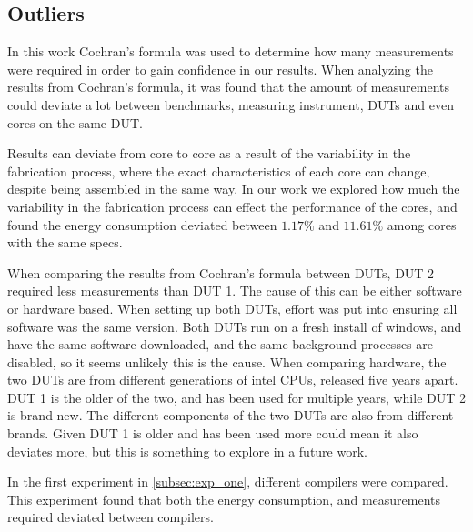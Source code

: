 \subsection{Outliers}

In this work Cochran's formula was used to determine how many measurements were required in order to gain confidence in our results. When analyzing the results from Cochran's formula, it was found that the amount of measurements could deviate a lot between benchmarks, measuring instrument, DUTs and even cores on the same DUT.

Results can deviate from core to core as a result of the variability in the fabrication process, where the exact characteristics of each core can change, despite being assembled in the same way.\cite{Mauzy2020} In our work we explored how much the variability in the fabrication process can effect the performance of the cores, and found the energy consumption deviated between $1.17\%$ and $11.61\%$ among cores with the same specs.

When comparing the results from Cochran's formula between DUTs, DUT 2 required less measurements than DUT 1. The cause of this can be either software or hardware based. When setting up both DUTs, effort was put into ensuring all software was the same version. Both DUTs run on a fresh install of windows, and have the same software downloaded, and the same background processes are disabled, so it seems unlikely this is the cause. When comparing hardware, the two DUTs are from different generations of intel CPUs, released five years apart. DUT 1 is the older of the two, and has been used for multiple years, while DUT 2 is brand new. The different components of the two DUTs are also from different brands. Given DUT 1 is older and has been used more could mean it also deviates more, but this is something to explore in a future work.

In the first experiment in \cref{subsec:exp_one}, different compilers were compared. This experiment found that both the energy consumption, and measurements required deviated between compilers.




